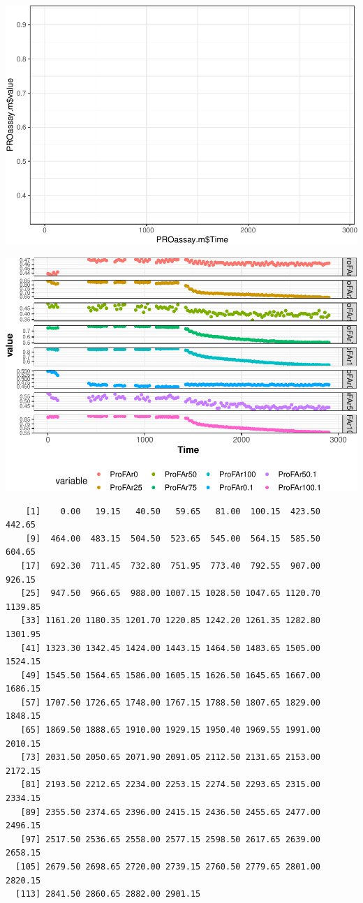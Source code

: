 \documentclass[12pt,twoside]{reedthesis}
\begin{document}
  \begin{center}\includegraphics{tesis_files/figure-latex/Cinetics-2} \end{center}
  
  \begin{center}\includegraphics{tesis_files/figure-latex/Cinetics-3} \end{center}
  
  \begin{verbatim}
    [1]    0.00   19.15   40.50   59.65   81.00  100.15  423.50  442.65
    [9]  464.00  483.15  504.50  523.65  545.00  564.15  585.50  604.65
   [17]  692.30  711.45  732.80  751.95  773.40  792.55  907.00  926.15
   [25]  947.50  966.65  988.00 1007.15 1028.50 1047.65 1120.70 1139.85
   [33] 1161.20 1180.35 1201.70 1220.85 1242.20 1261.35 1282.80 1301.95
   [41] 1323.30 1342.45 1424.00 1443.15 1464.50 1483.65 1505.00 1524.15
   [49] 1545.50 1564.65 1586.00 1605.15 1626.50 1645.65 1667.00 1686.15
   [57] 1707.50 1726.65 1748.00 1767.15 1788.50 1807.65 1829.00 1848.15
   [65] 1869.50 1888.65 1910.00 1929.15 1950.40 1969.55 1991.00 2010.15
   [73] 2031.50 2050.65 2071.90 2091.05 2112.50 2131.65 2153.00 2172.15
   [81] 2193.50 2212.65 2234.00 2253.15 2274.50 2293.65 2315.00 2334.15
   [89] 2355.50 2374.65 2396.00 2415.15 2436.50 2455.65 2477.00 2496.15
   [97] 2517.50 2536.65 2558.00 2577.15 2598.50 2617.65 2639.00 2658.15
  [105] 2679.50 2698.65 2720.00 2739.15 2760.50 2779.65 2801.00 2820.15
  [113] 2841.50 2860.65 2882.00 2901.15
  \end{verbatim}
  
\end{document}
